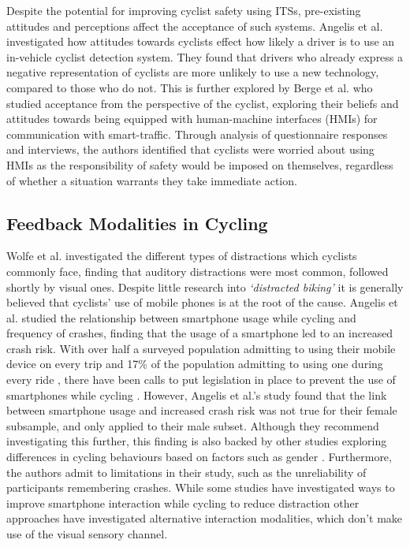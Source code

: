 \documentclass{mpaper}
\begin{document}
Despite the potential for improving cyclist safety using ITSs, pre-existing attitudes and perceptions affect the acceptance of such systems. Angelis et al. \cite{de2017negative} investigated how attitudes towards cyclists effect how likely a driver is to use an in-vehicle cyclist detection system. They found that drivers who already express a negative representation of cyclists are more unlikely to use a new technology, compared to those who do not. This is further explored by Berge et al. \cite{berge2022cyclists} who studied acceptance from the perspective of the cyclist, exploring their beliefs and attitudes towards being equipped with human-machine interfaces (HMIs) for communication with smart-traffic. Through analysis of questionnaire responses and interviews, the authors identified that cyclists were worried about using HMIs as the responsibility of safety would be imposed on themselves, regardless of whether a situation warrants they take immediate action. 


\subsection{Feedback Modalities in Cycling}
Wolfe et al. \cite{wolfe2016distracted} investigated the different types of distractions which cyclists commonly face, finding that auditory distractions were most common, followed shortly by visual ones. Despite little research into \textit{‘distracted biking’} \cite{mwakalonge2014distracted} it is generally believed that cyclists’ use of mobile phones is at the root of the cause. Angelis et al. \cite{doi:10.1080/19439962.2019.1591559} studied the relationship between smartphone usage while cycling and frequency of crashes, finding that the usage of a smartphone led to an increased crash risk. With over half a surveyed population admitting to using their mobile device on every trip \cite{GOLDENBELD20121} and 17\% of the population admitting to using one during every ride \cite{goldenbeld2010use}, there have been calls to put legislation in place to prevent the use of smartphones while cycling \cite{banphoneuse}. However, Angelis et al.'s study found that the link between smartphone usage and increased crash risk was not true for their female subsample, and only applied to their male subset. Although they recommend investigating this further, this finding is also backed by other studies exploring differences in cycling behaviours based on factors such as gender \cite{BEHNOOD201735}. Furthermore, the authors admit to limitations in their study, such as the unreliability of participants remembering crashes. While some studies have investigated ways to improve smartphone interaction while cycling to reduce distraction \cite{10.1145/3544548.3580971, 10.1145/3152832.3152871} other approaches have investigated alternative interaction modalities, which don’t make use of the visual sensory channel.
\end{document}
